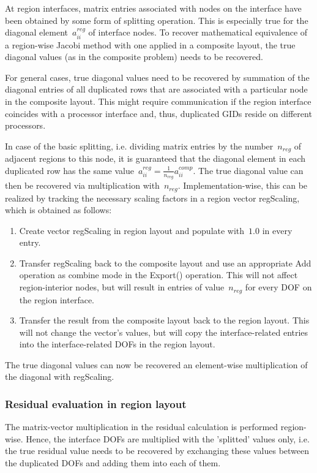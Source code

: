 \documentclass[11pt]{article}
\begin{document}
At region interfaces, matrix entries associated with nodes on the interface
have been obtained by some form of splitting operation. This is especially true for the diagonal element~$a^{reg}_{ii}$ of interface nodes.
To recover mathematical equivalence of a region-wise Jacobi method with one applied in a composite layout,
the true diagonal values (as in the composite problem) needs to be recovered.

For general cases, true diagonal values need to be recovered by summation of the diagonal entries of all duplicated rows
that are associated with a particular node in the composite layout.
This might require communication if the region interface coincides with a processor interface
and, thus, duplicated GIDs reside on different processors.

In case of the basic splitting, i.e. dividing matrix entries by the number~$n_{reg}$ of adjacent regions to this node, it is guaranteed
that the diagonal element in each duplicated row has the same value~$a^{reg}_{ii} = \frac{1}{n_{reg}}a^{comp}_{ii}$.
The true diagonal value can then be recovered via multiplication with~$n_{reg}$.
Implementation-wise, this can be realized by tracking the necessary scaling factors in a region vector {\sf regScaling},
which is obtained as follows:
\begin{enumerate}
\item Create vector {\sf regScaling} in region layout and populate with~$1.0$ in every entry.
\item Transfer {\sf regScaling} back to the composite layout and use an appropriate {\sf Add} operation as combine mode in the {\sf Export()} operation.
This will not affect region-interior nodes, but will result in entries of value~$n_{reg}$ for every DOF on the region interface.
\item Transfer the result from the composite layout back to the region layout. This will not change the vector's values,
but will copy the interface-related entries into the interface-related DOFs in the region layout.
\end{enumerate}
The true diagonal values can now be recovered an element-wise multiplication of the diagonal with {\sf regScaling}.

\subsubsection{Residual evaluation in region layout}
\label{sec:CalcRegionalResidual}

The matrix-vector multiplication in the residual calculation is performed region-wise.
Hence, the interface DOFs are multiplied with the 'splitted' values only, i.e. the true residual value needs to be recovered
by exchanging these values between the duplicated DOFs and adding them into each of them.
\end{document}
